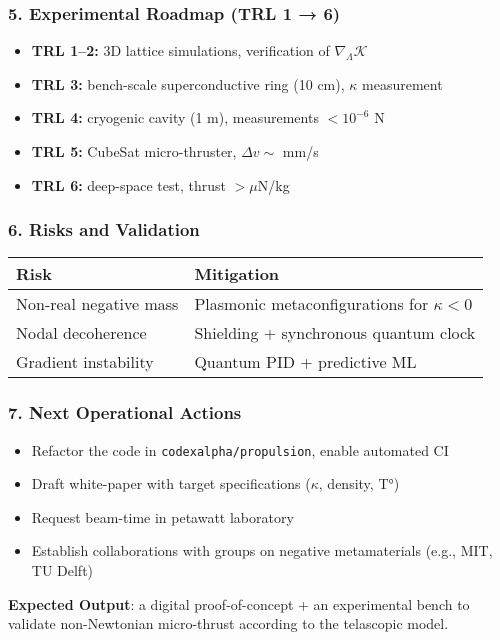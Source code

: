 \documentclass[12pt]{article}
\begin{document}
\subsubsection*{5. Experimental Roadmap (TRL 1 → 6)}
\begin{itemize}
    \item \textbf{TRL 1–2:} 3D lattice simulations, verification of $\nabla_\Lambda \mathcal{K}$
    \item \textbf{TRL 3:} bench-scale superconductive ring (10 cm), $\kappa$ measurement
    \item \textbf{TRL 4:} cryogenic cavity (1 m), measurements $< 10^{-6}$ N
    \item \textbf{TRL 5:} CubeSat micro-thruster, $\Delta v \sim$ mm/s
    \item \textbf{TRL 6:} deep-space test, thrust $> \mu$N/kg
\end{itemize}

\subsubsection*{6. Risks and Validation}
\begin{table}[H]
\centering
\begin{tabular}{ll}
\toprule
\textbf{Risk} & \textbf{Mitigation} \\
\midrule
Non-real negative mass & Plasmonic metaconfigurations for $\kappa < 0$ \\
Nodal decoherence & Shielding + synchronous quantum clock \\
Gradient instability & Quantum PID + predictive ML \\
\bottomrule
\end{tabular}
\end{table}

\subsubsection*{7. Next Operational Actions}
\begin{itemize}
    \item Refactor the code in \texttt{codexalpha/propulsion}, enable automated CI
    \item Draft white-paper with target specifications ($\kappa$, density, T°)
    \item Request beam-time in petawatt laboratory
    \item Establish collaborations with groups on negative metamaterials (e.g., MIT, TU Delft)
\end{itemize}
\textbf{Expected Output}: a digital proof-of-concept + an experimental bench to validate non-Newtonian micro-thrust according to the telascopic model.
\end{document}
